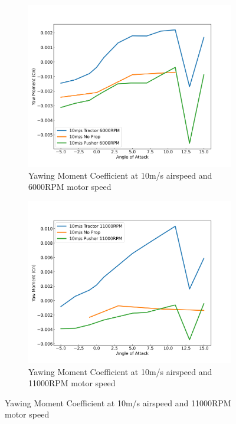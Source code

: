 \begin{figure}[H]
    \centering
    \begin{subfigure}[b]{0.467\textwidth}
        \centering
        \includegraphics[width=\textwidth]{05_Results/Figs/Cn/10ms_6000RPM_Cn.png}
        \caption{Yawing Moment Coefficient at 10m/s airspeed and 6000RPM motor speed}
        \label{fig:Cn_10ms_6000}
    \end{subfigure}
    \begin{subfigure}[b]{0.467\textwidth}
        \centering
        \includegraphics[width=\textwidth]{05_Results/Figs/Cn/10ms_11000RPM_Cn.png}
        \caption{Yawing Moment Coefficient at 10m/s airspeed and 11000RPM motor speed}

\end{subfigure}
\end{figure}
